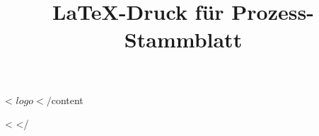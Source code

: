 \documentclass[a4paper]{scrartcl}
\begin{document}
\title{LaTeX-Druck für Prozess-Stammblatt}
\maketitle

<%
    ${logo}
</%

${content}

<%
</%
\end{document}
